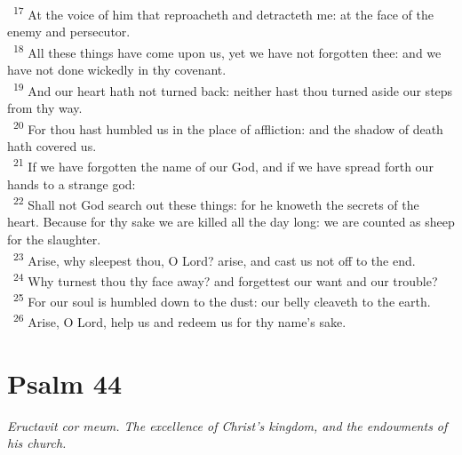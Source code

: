 \documentclass[a5paper,12pt]{article}
\begin{document}
\begin{multicols*}{2}
~\textsuperscript{17} At the voice of him that reproacheth and detracteth me: at the face of the enemy and persecutor.\\
~\textsuperscript{18} All these things have come upon us, yet we have not forgotten thee: and we have not done wickedly in thy covenant.\\
~\textsuperscript{19} And our heart hath not turned back: neither hast thou turned aside our steps from thy way.\\
~\textsuperscript{20} For thou hast humbled us in the place of affliction: and the shadow of death hath covered us.\\
~\textsuperscript{21} If we have forgotten the name of our God, and if we have spread forth our hands to a strange god:\\
~\textsuperscript{22} Shall not God search out these things: for he knoweth the secrets of the heart. Because for thy sake we are killed all the day long: we are counted as sheep for the slaughter.\\
~\textsuperscript{23} Arise, why sleepest thou, O Lord? arise, and cast us not off to the end.\\
~\textsuperscript{24} Why turnest thou thy face away? and forgettest our want and our trouble?\\
~\textsuperscript{25} For our soul is humbled down to the dust: our belly cleaveth to the earth.\\
~\textsuperscript{26} Arise, O Lord, help us and redeem us for thy name's sake.\\

\section{Psalm 44}
\label{sec:org858db64}
\emph{Eructavit cor meum. The excellence of Christ's kingdom, and the endowments of his church.}\\


\end{multicols*}
\end{document}
